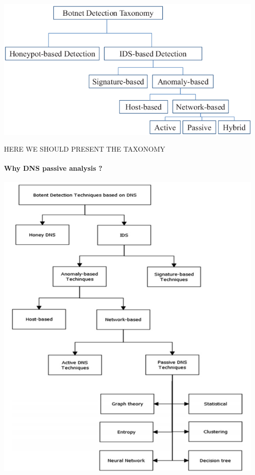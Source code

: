 \includegraphics[scale=.8]{img/Botnet-detection-taxonomy.png}

HERE WE SHOULD PRESENT THE TAXONOMY

\paragraph{Why DNS passive analysis ?}

\includegraphics[scale=.8]{img/botnet_detection_techniques.jpg}


